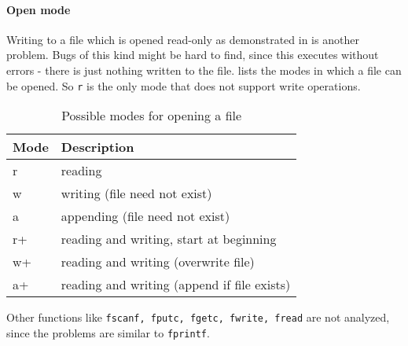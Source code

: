 \paragraph*{Open mode}
Writing to a file which is opened read-only as demonstrated in  is another problem. Bugs of this kind might be hard to find, since this executes without errors - there is just nothing written to the file.
 lists the modes in which a file can be opened. So \verb|r| is the only mode that does not support write operations.
\begin{table}[ht]
\centering
\begin{tabular}{ll}\hline
Mode & Description\\\hline
r  & reading\\
w  & writing (file need not exist)\\
a  & appending (file need not exist)\\
r+ & reading and writing, start at beginning\\
w+ & reading and writing (overwrite file)\\
a+ & reading and writing (append if file exists)
\end{tabular}
\caption{Possible modes for opening a file}
\label{tbl:open_modes}
\end{table}

Other functions like \verb|fscanf, fputc, fgetc, fwrite, fread| are not analyzed, since the problems are similar to \verb|fprintf|.


